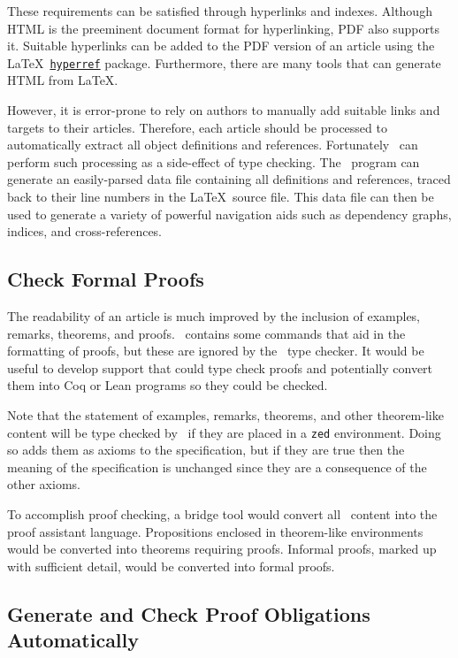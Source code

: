 \documentclass{amsart}
\begin{document}
 These requirements can be satisfied through hyperlinks and indexes.
 Although HTML is the preeminent document format for hyperlinking, PDF also supports it.
 Suitable hyperlinks can be added to the PDF version of an article using the \LaTeX\
 \href{https://ctan.org/pkg/hyperref}{\texttt{hyperref}} package.
 Furthermore, there are many tools that can generate HTML from \LaTeX.
 
 However, it is error-prone to rely on authors to manually add suitable links and targets to their articles.
 Therefore, each article should be processed to automatically extract all object definitions and references.
 Fortunately \fuzz\ can perform such processing as a side-effect of type checking.
 The \fuzz\ program can generate an easily-parsed data file containing all definitions and references,
 traced back to their line numbers in the \LaTeX\ source file.
 This data file can then be used to generate a variety of powerful navigation aids such as
 dependency graphs, indices, and cross-references.
 
 \hypertarget{check-formal-proof}{}
 \subsection{Check Formal Proofs}
 
 The readability of an article is much improved by the inclusion of examples, remarks, theorems, and proofs.
 \ZN\ contains some commands that aid in the formatting of proofs, but these are ignored by the \fuzz\ type checker.
 It would be useful to develop support that could type check proofs and potentially convert them into Coq or Lean programs
 so they could be checked.
 
 Note that the statement of examples, remarks, theorems, and other theorem-like content will be type checked by \fuzz\ if
 they are placed in a \texttt{zed} environment. 
 Doing so adds them as axioms to the specification, but if they are true then the meaning of the specification is unchanged
 since they are a consequence of the other axioms.
 
 To accomplish proof checking, a bridge tool would convert all \ZN\ content into the proof assistant language.
 Propositions enclosed in theorem-like environments would be converted into theorems requiring proofs.
 Informal proofs, marked up with sufficient detail, would be converted into formal proofs.
 
 \hypertarget{generate-and-check-proof-obligations-automatically}{}
 \subsection{Generate and Check Proof Obligations Automatically}
 
\end{document}
